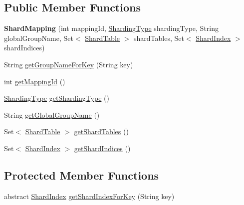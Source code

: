 \subsection*{Public Member Functions}
\begin{DoxyCompactItemize}
\item 
\mbox{\label{classcom_1_1mysql_1_1fabric_1_1_shard_mapping_a1bd4eea3f59b014b4cbbffbc9955c331}} 
{\bfseries Shard\+Mapping} (int mapping\+Id, \mbox{\hyperlink{enumcom_1_1mysql_1_1fabric_1_1_sharding_type}{Sharding\+Type}} sharding\+Type, String global\+Group\+Name, Set$<$ \mbox{\hyperlink{classcom_1_1mysql_1_1fabric_1_1_shard_table}{Shard\+Table}} $>$ shard\+Tables, Set$<$ \mbox{\hyperlink{classcom_1_1mysql_1_1fabric_1_1_shard_index}{Shard\+Index}} $>$ shard\+Indices)
\item 
String \mbox{\hyperlink{classcom_1_1mysql_1_1fabric_1_1_shard_mapping_a614f8944251516b5f55e0a20e710ccba}{get\+Group\+Name\+For\+Key}} (String key)
\item 
int \mbox{\hyperlink{classcom_1_1mysql_1_1fabric_1_1_shard_mapping_aec74534cc8c237229a6da6b3ac657735}{get\+Mapping\+Id}} ()
\item 
\mbox{\hyperlink{enumcom_1_1mysql_1_1fabric_1_1_sharding_type}{Sharding\+Type}} \mbox{\hyperlink{classcom_1_1mysql_1_1fabric_1_1_shard_mapping_a576cf21291d18696ee2ca479861fd099}{get\+Sharding\+Type}} ()
\item 
String \mbox{\hyperlink{classcom_1_1mysql_1_1fabric_1_1_shard_mapping_a87e18cf8f09fdab3db0cf08d239fabd8}{get\+Global\+Group\+Name}} ()
\item 
Set$<$ \mbox{\hyperlink{classcom_1_1mysql_1_1fabric_1_1_shard_table}{Shard\+Table}} $>$ \mbox{\hyperlink{classcom_1_1mysql_1_1fabric_1_1_shard_mapping_acce92dfd014b358a9873a90a23a7a89c}{get\+Shard\+Tables}} ()
\item 
Set$<$ \mbox{\hyperlink{classcom_1_1mysql_1_1fabric_1_1_shard_index}{Shard\+Index}} $>$ \mbox{\hyperlink{classcom_1_1mysql_1_1fabric_1_1_shard_mapping_afb50468e08f25ffe3fd2dd3dae8c5d8a}{get\+Shard\+Indices}} ()
\end{DoxyCompactItemize}
\subsection*{Protected Member Functions}
\begin{DoxyCompactItemize}
\item 
abstract \mbox{\hyperlink{classcom_1_1mysql_1_1fabric_1_1_shard_index}{Shard\+Index}} \mbox{\hyperlink{classcom_1_1mysql_1_1fabric_1_1_shard_mapping_a3bca2f5f590422ea653e744d578b3bc0}{get\+Shard\+Index\+For\+Key}} (String key)
\end{DoxyCompactItemize}
